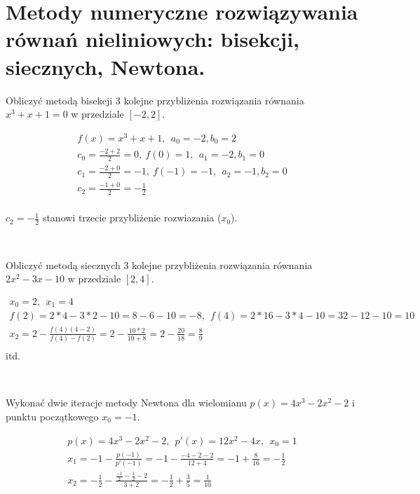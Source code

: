 \documentclass[main.tex]{subfiles}
\begin{document}
    \newpage

    \section{Metody numeryczne rozwiązywania równań nieliniowych: bisekcji, siecznych, Newtona.}

    \begin{exercise}
        Obliczyć metodą bisekcji 3 kolejne przybliżenia rozwiązania równania $x^3 + x + 1 = 0$ w przedziale $[-2, 2]$.
    \end{exercise}

    \begin{gather*}
        f(x) = x^3 + x + 1, ~~ a_0 = -2, b_0 = 2\\
        c_0 = \frac{-2+2}{2} = 0, ~ f(0) = 1, ~~ a_1 = -2, b_1 = 0\\
        c_1 = \frac{-2+0}{2} = -1, ~ f(-1) = -1, ~~ a_2 = -1, b_2 = 0\\
        c_2 = \frac{-1+0}{2} = -\frac{1}{2}\\
    \end{gather*}

    $c_2 = -\frac{1}{2}$ stanowi trzecie przybliżenie rozwiazania ($x_0$).

    \hfill \\

    \begin{exercise}
        Obliczyć metodą siecznych 3 kolejne przybliżenia rozwiązania równania $2x^2 - 3x - 10$ w przedziale $[2, 4]$.
    \end{exercise}
    \begin{gather*}
        x_0 = 2, ~~ x_1 = 4\\
        f(2) = 2*4 - 3*2 - 10 = 8 - 6 - 10 = -8, ~~ f(4) = 2*16 - 3*4 - 10 = 32 - 12 - 10 = 10\\
        x_2 = 2 - \frac{f(4)(4-2)}{f(4) - f(2)} = 2 - \frac{10*2}{10 + 8} = 2 - \frac{20}{18} = \frac{8}{9}\\
    \end{gather*}
    itd.

    \hfill \\

    \begin{exercise}
        Wykonać dwie iteracje metody Newtona dla wielomianu $p(x) = 4x^3 - 2x^2 - 2$ i punktu początkowego $x_0 = -1$.
    \end{exercise}

    \begin{gather*}
        p(x) = 4x^3 - 2x^2 - 2, ~~ p'(x) = 12x^2 - 4x, ~~ x_0 = 1\\
        x_1 = -1 - \frac{p(-1)}{p'(-1)} = -1 - \frac{-4-2-2}{12+4} = -1 + \frac{8}{16}  = -\frac{1}{2}\\
        x_2 = -\frac{1}{2} - \frac{\frac{-1}{2} - \frac{1}{2} - 2}{3 + 2} = -\frac{1}{2} + \frac{3}{5} = \frac{1}{10}\\
    \end{gather*}
\end{document}
